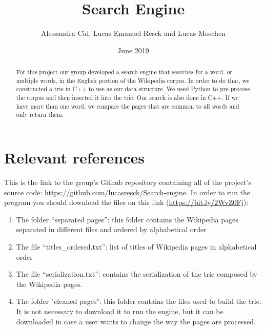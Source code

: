 \documentclass{article}
\title{Search Engine}
\author{Alessandra Cid, Lucas Emanuel Resck  
and Lucas Moschen}
\date{June 2019}
\begin{document}
\maketitle

\begin{abstract}
For this project our group developed a search engine that searches for a word, or multiple words, in the English portion of the Wikipedia corpus. In order to do that, we constructed a trie in C++ to use as our data structure. We used Python to pre-process the corpus and then inserted it into the trie. Our search is also done in C++. If we have more than one word, we compare the pages that are common to all words and only return them. 
\end{abstract}

\section*{Relevant references}
This is the link to the group's Github repository containing all of the project's source code: \url{https://github.com/lucasresck/Search-engine}.
In order to run the program you should download the files on this link (\url{https://bit.ly/2WvZ0Fj}): 

\begin{enumerate}
\item The folder ``separated pages'': this folder contains the Wikipedia pages separated in different files and ordered by alphabetical order

\item The file ``titles\_ordered.txt'': list of titles of Wikipedia pages in alphabetical order

\item The file ``serialization.txt'': contains the serialization of the trie composed by the Wikipedia pages. 

\item The folder "cleaned pages": this folder contains the files used to build the trie. It is not necessary to download it to run the engine, but it can be downloaded in case a user wants to change the way the pages are processed. 
 \end{enumerate}
\end{document}
